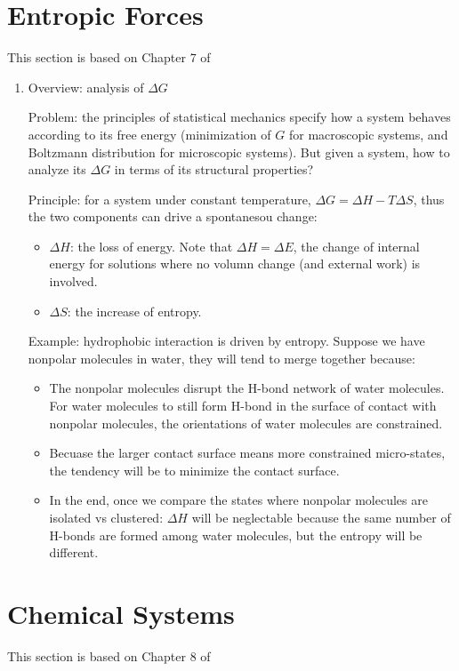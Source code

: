 \documentclass{report}
\begin{document}
\section{Entropic Forces}
This section is based on Chapter 7 of \cite{Nelson04}
\begin{enumerate}

\item{Overview: analysis of $\Delta G$}

Problem: the principles of statistical mechanics specify how a system behaves according to its free energy (minimization of $G$ for macroscopic systems, and Boltzmann distribution for microscopic systems). But given a system, how to analyze its $\Delta G$ in terms of its structural properties? 

Principle: for a system under constant temperature, $\Delta G = \Delta H - T \Delta S$, thus the two components can drive a spontanesou change: 
\begin{itemize}
\item $\Delta H$: the loss of energy. Note that $\Delta H = \Delta E$, the change of internal energy for solutions where no volumn change (and external work) is involved. 
\item $\Delta S$: the increase of entropy. 
\end{itemize}

Example: hydrophobic interaction is driven by entropy. Suppose we have nonpolar molecules in water, they will tend to merge together because: 
\begin{itemize}
\item The nonpolar molecules disrupt the H-bond network of water molecules. For water molecules to still form H-bond in the surface of contact with nonpolar molecules, the orientations of water molecules are constrained. 
\item Becuase the larger contact surface means more constrained micro-states, the tendency will be to minimize the contact surface. 
\item In the end, once we compare the states where nonpolar molecules are isolated vs clustered: $\Delta H$ will be neglectable because the same number of H-bonds are formed among water molecules, but the entropy will be different. 
\end{itemize}
 
\end{enumerate}
\section{Chemical Systems}
This section is based on Chapter 8 of \cite{Nelson04}
\end{document}
